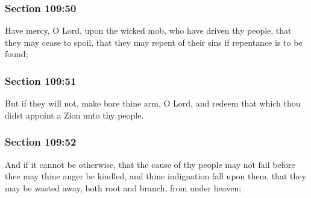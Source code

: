 	\subsubsection{Section 109:50} %
		\label{DC109-50}

		Have mercy, O Lord, upon the wicked mob, who have driven thy people, that they may cease to spoil, that they may repent of their sins if repentance is to be found;


	\subsubsection{Section 109:51} %
		\label{DC109-51}

		But if they will not, make bare thine arm, O Lord, and redeem that which thou didst appoint a Zion unto thy people.


	\subsubsection{Section 109:52} %
		\label{DC109-52}

		And if it cannot be otherwise, that the cause of thy people may not fail before thee may thine anger be kindled, and thine indignation fall upon them, that they may be wasted away, both root and branch, from under heaven;


